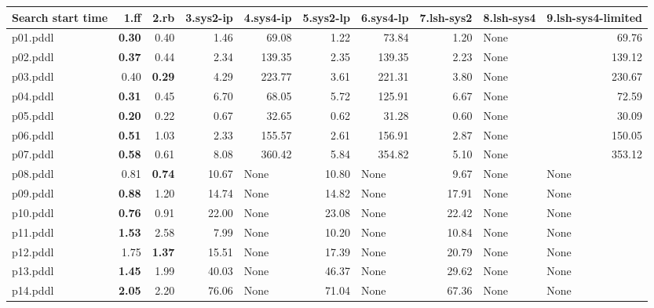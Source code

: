 \documentclass{article}
\begin{document}
\begin{tabular}{@{}lrrrrrrrrr@{}}
Search start time & 1.ff & 2.rb & 3.sys2-ip & 4.sys4-ip & 5.sys2-lp & 6.sys4-lp & 7.lsh-sys2 & 8.lsh-sys4 & 9.lsh-sys4-limited \\
\midrule
p01.pddl & \textbf{0.30} & 0.40 & 1.46 & 69.08 & 1.22 & 73.84 & 1.20 & \multicolumn{1}{|l|}{None} & 69.76 \\
p02.pddl & \textbf{0.37} & 0.44 & 2.34 & 139.35 & 2.35 & 139.35 & 2.23 & \multicolumn{1}{|l|}{None} & 139.12 \\
p03.pddl & 0.40 & \textbf{0.29} & 4.29 & 223.77 & 3.61 & 221.31 & 3.80 & \multicolumn{1}{|l|}{None} & 230.67 \\
p04.pddl & \textbf{0.31} & 0.45 & 6.70 & 68.05 & 5.72 & 125.91 & 6.67 & \multicolumn{1}{|l|}{None} & 72.59 \\
p05.pddl & \textbf{0.20} & 0.22 & 0.67 & 32.65 & 0.62 & 31.28 & 0.60 & \multicolumn{1}{|l|}{None} & 30.09 \\
p06.pddl & \textbf{0.51} & 1.03 & 2.33 & 155.57 & 2.61 & 156.91 & 2.87 & \multicolumn{1}{|l|}{None} & 150.05 \\
p07.pddl & \textbf{0.58} & 0.61 & 8.08 & 360.42 & 5.84 & 354.82 & 5.10 & \multicolumn{1}{|l|}{None} & 353.12 \\
p08.pddl & 0.81 & \textbf{0.74} & 10.67 & \multicolumn{1}{|l|}{None} & 10.80 & \multicolumn{1}{|l|}{None} & 9.67 & \multicolumn{1}{|l|}{None} & \multicolumn{1}{|l|}{None} \\
p09.pddl & \textbf{0.88} & 1.20 & 14.74 & \multicolumn{1}{|l|}{None} & 14.82 & \multicolumn{1}{|l|}{None} & 17.91 & \multicolumn{1}{|l|}{None} & \multicolumn{1}{|l|}{None} \\
p10.pddl & \textbf{0.76} & 0.91 & 22.00 & \multicolumn{1}{|l|}{None} & 23.08 & \multicolumn{1}{|l|}{None} & 22.42 & \multicolumn{1}{|l|}{None} & \multicolumn{1}{|l|}{None} \\
p11.pddl & \textbf{1.53} & 2.58 & 7.99 & \multicolumn{1}{|l|}{None} & 10.20 & \multicolumn{1}{|l|}{None} & 10.84 & \multicolumn{1}{|l|}{None} & \multicolumn{1}{|l|}{None} \\
p12.pddl & 1.75 & \textbf{1.37} & 15.51 & \multicolumn{1}{|l|}{None} & 17.39 & \multicolumn{1}{|l|}{None} & 20.79 & \multicolumn{1}{|l|}{None} & \multicolumn{1}{|l|}{None} \\
p13.pddl & \textbf{1.45} & 1.99 & 40.03 & \multicolumn{1}{|l|}{None} & 46.37 & \multicolumn{1}{|l|}{None} & 29.62 & \multicolumn{1}{|l|}{None} & \multicolumn{1}{|l|}{None} \\
p14.pddl & \textbf{2.05} & 2.20 & 76.06 & \multicolumn{1}{|l|}{None} & 71.04 & \multicolumn{1}{|l|}{None} & 67.36 & \multicolumn{1}{|l|}{None} & \multicolumn{1}{|l|}{None} \\

\end{tabular}
\end{document}
